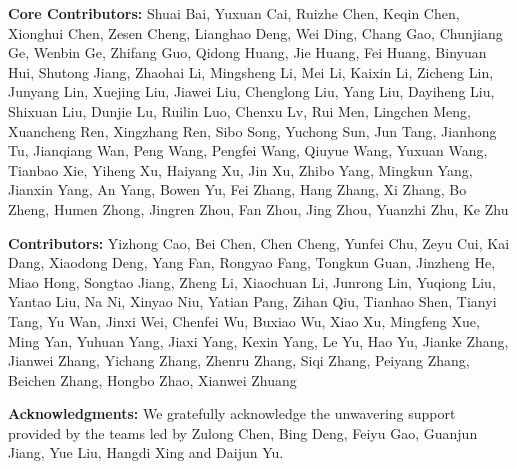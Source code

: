 \documentclass{article} %
\begin{document}
\textbf{Core Contributors:} Shuai Bai, Yuxuan Cai, Ruizhe Chen, Keqin Chen, Xionghui Chen, Zesen Cheng, Lianghao Deng, Wei Ding, Chang Gao, Chunjiang Ge, Wenbin Ge, Zhifang Guo, Qidong Huang, Jie Huang, Fei Huang, Binyuan Hui, Shutong Jiang, Zhaohai Li, Mingsheng Li, Mei Li, Kaixin Li, Zicheng Lin, Junyang Lin, Xuejing Liu, Jiawei Liu, Chenglong Liu, Yang Liu, Dayiheng Liu, Shixuan Liu, Dunjie Lu, Ruilin Luo, Chenxu Lv, Rui Men, Lingchen Meng, Xuancheng Ren, Xingzhang Ren, Sibo Song, Yuchong Sun, Jun Tang, Jianhong Tu, Jianqiang Wan, Peng Wang, Pengfei Wang, Qiuyue Wang, Yuxuan Wang, Tianbao Xie, Yiheng Xu, Haiyang Xu, Jin Xu, Zhibo Yang, Mingkun Yang, Jianxin Yang, An Yang, Bowen Yu, Fei Zhang, Hang Zhang, Xi Zhang, Bo Zheng, Humen Zhong, Jingren Zhou, Fan Zhou, Jing Zhou, Yuanzhi Zhu, Ke Zhu

\textbf{Contributors:} Yizhong Cao, Bei Chen, Chen Cheng, Yunfei Chu, Zeyu Cui, Kai Dang, Xiaodong Deng, Yang Fan, Rongyao Fang, Tongkun Guan, Jinzheng He, Miao Hong, Songtao Jiang, Zheng Li, Xiaochuan Li, Junrong Lin, Yuqiong Liu, Yantao Liu, Na Ni, Xinyao Niu, Yatian Pang, Zihan Qiu, Tianhao Shen, Tianyi Tang, Yu Wan, Jinxi Wei, Chenfei Wu, Buxiao Wu, Xiao Xu, Mingfeng Xue, Ming Yan, Yuhuan Yang, Jiaxi Yang, Kexin Yang, Le Yu, Hao Yu, Jianke Zhang, Jianwei Zhang, Yichang Zhang, Zhenru Zhang, Siqi Zhang, Peiyang Zhang, Beichen Zhang, Hongbo Zhao, Xianwei Zhuang

\textbf{Acknowledgments:} We gratefully acknowledge the unwavering support provided by the teams led by Zulong Chen, Bing Deng, Feiyu Gao, Guanjun Jiang, Yue Liu, Hangdi Xing and Daijun Yu.



\appendix
\clearpage


\end{document}
